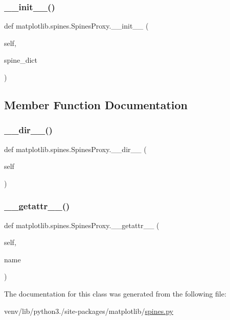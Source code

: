 \subsubsection{\texorpdfstring{\+\_\+\+\_\+init\+\_\+\+\_\+()}{\_\_init\_\_()}}
{\footnotesize\ttfamily def matplotlib.\+spines.\+Spines\+Proxy.\+\_\+\+\_\+init\+\_\+\+\_\+ (\begin{DoxyParamCaption}\item[{}]{self,  }\item[{}]{spine\+\_\+dict }\end{DoxyParamCaption})}



\subsection{Member Function Documentation}
\mbox{\label{classmatplotlib_1_1spines_1_1SpinesProxy_afb18d1d18699eb1deb623830914c8ed5}} 
\subsubsection{\texorpdfstring{\+\_\+\+\_\+dir\+\_\+\+\_\+()}{\_\_dir\_\_()}}
{\footnotesize\ttfamily def matplotlib.\+spines.\+Spines\+Proxy.\+\_\+\+\_\+dir\+\_\+\+\_\+ (\begin{DoxyParamCaption}\item[{}]{self }\end{DoxyParamCaption})}

\mbox{\label{classmatplotlib_1_1spines_1_1SpinesProxy_a7e8841c7e96df07feb9e0fb354fa537f}} 
\subsubsection{\texorpdfstring{\+\_\+\+\_\+getattr\+\_\+\+\_\+()}{\_\_getattr\_\_()}}
{\footnotesize\ttfamily def matplotlib.\+spines.\+Spines\+Proxy.\+\_\+\+\_\+getattr\+\_\+\+\_\+ (\begin{DoxyParamCaption}\item[{}]{self,  }\item[{}]{name }\end{DoxyParamCaption})}



The documentation for this class was generated from the following file\+:\begin{DoxyCompactItemize}
\item 
venv/lib/python3./site-\/packages/matplotlib/\hyperlink{spines_8py}{spines.\+py}\end{DoxyCompactItemize}
